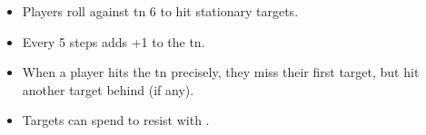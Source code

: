 \begin{itemize}
  \item
  Players roll  against \gls{tn} 6 to hit stationary targets.
  \item
  Every 5 steps adds +1 to the \gls{tn}.
  \item
  When a player hits the \gls{tn} precisely, they miss their first target, but hit another target behind (if any).
  \item
  Targets can spend  to resist with .
\end{itemize}
